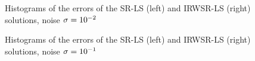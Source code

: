 \begin{figure}%
\centering
\caption{Histograms of the errors of the SR-LS (left) and IRWSR-LS (right) solutions, noise $\protect\sigma = 10^{-2}$}
\label{fig:Noise02IRW}
\end{figure}

\begin{figure}%
\centering
\caption{Histograms of the errors of the SR-LS (left) and IRWSR-LS (right) solutions, noise $\protect\sigma = 10^{-1}$}
\label{fig:Noise01IRW}
\end{figure}

